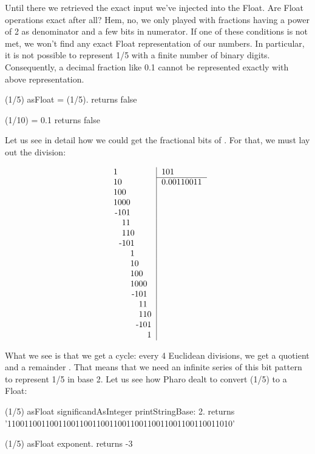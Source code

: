 \documentclass[a4paper,10pt,twoside]{book}
\begin{document}
Until there we retrieved the exact input we've injected into the Float. Are Float operations exact after all? Hem, no, we only played with fractions having a power of 2 as denominator and a few bits in numerator. If one of these conditions is not met, we won't find any exact Float representation of our numbers. In particular, it is not possible to represent 1/5 with a finite number of binary digits. Consequently, a decimal fraction like 0.1 cannot be represented exactly with above representation.
 \begin{code}{}
(1/5) asFloat = (1/5).
	returns false
	
(1/10) = 0.1
	returns false
\end{code}

Let us see in detail how we could get the fractional bits of  \ie {}. For that, we must lay out the division:

\[
\begin{tabular}{r|l}
\multicolumn{1}{r|}{1\phantom{00000000}} & 101 \\  \cline{2-2}
10\phantom{0000000} & 0.00110011 \\ 
100\phantom{000000}  & \\
1000\phantom{00000}  & \\
-101\phantom{00000}  & \\
   11\phantom{00000}  & \\
   110\phantom{0000} & \\
  -101\phantom{0000} & \\
        1\phantom{0000} & \\
        10\phantom{000} & \\
        100\phantom{00} & \\
        1000\phantom{0} & \\
         -101\phantom{0} & \\
             11\phantom{0} & \\
             110 & \\
            -101 & \\
                  1 & \\
\end{tabular} 
 \]

What we see is that we get a cycle: every 4 Euclidean divisions, we get a quotient  and a remainder . That means that we need an infinite series of this bit pattern  to represent 1/5 in base 2. Let us see how Pharo dealt to convert (1/5) to a Float:

 \begin{code}{}
(1/5) asFloat significandAsInteger printStringBase: 2.
	returns '11001100110011001100110011001100110011001100110011010'
	
(1/5) asFloat exponent.
	returns -3
\end{code}
\end{document}
